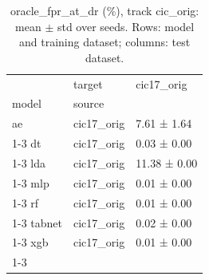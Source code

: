 \begin{table}
\caption{oracle_fpr_at_dr (\%), track cic_orig: mean $\pm$ std over seeds. Rows: model and training dataset; columns: test dataset.}
\label{tab:matrix_cic_orig_oracle_fpr_at_dr}
\begin{tabular}{lll}
\toprule
 & target & cic17_orig \\
model & source &  \\
\midrule
ae & cic17_orig & 7.61 ± 1.64 \\
\cline{1-3}
dt & cic17_orig & 0.03 ± 0.00 \\
\cline{1-3}
lda & cic17_orig & 11.38 ± 0.00 \\
\cline{1-3}
mlp & cic17_orig & 0.01 ± 0.00 \\
\cline{1-3}
rf & cic17_orig & 0.01 ± 0.00 \\
\cline{1-3}
tabnet & cic17_orig & 0.02 ± 0.00 \\
\cline{1-3}
xgb & cic17_orig & 0.01 ± 0.00 \\
\cline{1-3}
\bottomrule
\end{tabular}
\end{table}
